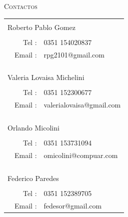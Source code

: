 \documentclass[a4paper,12pt]{report}
\begin{document}
\maketitle{}
\newpage

\clearpage \thispagestyle{empty}


\begin{flushright}
\scshape \Large Contactos\\[3cm]
\end{flushright}

\begin{flushright}
\begin{tabular}{l r l}
%
\hspace{5mm}&&\\
%
\multicolumn{3}{l}{Roberto Pablo Gomez}\\
\hline\\
& Tel :   & 0351 154020837  \\
& Email : & rpg2101@gmail.com  \\
%
\\ \\ \\ \\%
%
\multicolumn{3}{l}{Valeria Lovaisa Michelini}\\
\hline\\
& Tel :   & 0351 152300677  \\
& Email : & valerialovaisa@gmail.com \\
%
\\ \\ \\ \\%
%
\multicolumn{3}{l}{Orlando Micolini}\\
\hline\\
& Tel :   & 0351 153731094 \\
& Email : & omicolini@compuar.com \\
%
\\ \\ \\ \\%
%
\multicolumn{3}{l}{Federico Paredes}\\
\hline\\
& Tel :   & 0351 152389705  \\
& Email : & fedesor@gmail.com \\
%
\end{tabular}
\end{flushright}


\newpage
\tableofcontents{}
\end{document}
